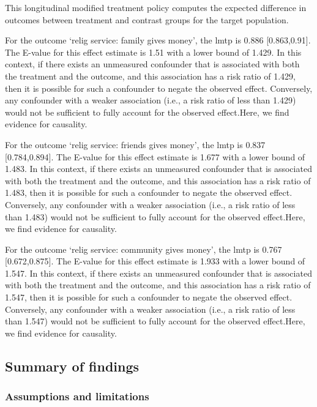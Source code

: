 \documentclass[
  singlecolumn]{article}
\begin{document}
This longitudinal modified treatment policy computes the expected
difference in outcomes between treatment and contrast groups for the
target population.

For the outcome `relig service: family gives money', the lmtp is 0.886
{[}0.863,0.91{]}. The E-value for this effect estimate is 1.51 with a
lower bound of 1.429. In this context, if there exists an unmeasured
confounder that is associated with both the treatment and the outcome,
and this association has a risk ratio of 1.429, then it is possible for
such a confounder to negate the observed effect. Conversely, any
confounder with a weaker association (i.e., a risk ratio of less than
1.429) would not be sufficient to fully account for the observed
effect.Here, we find evidence for causality.

For the outcome `relig service: friends gives money', the lmtp is 0.837
{[}0.784,0.894{]}. The E-value for this effect estimate is 1.677 with a
lower bound of 1.483. In this context, if there exists an unmeasured
confounder that is associated with both the treatment and the outcome,
and this association has a risk ratio of 1.483, then it is possible for
such a confounder to negate the observed effect. Conversely, any
confounder with a weaker association (i.e., a risk ratio of less than
1.483) would not be sufficient to fully account for the observed
effect.Here, we find evidence for causality.

For the outcome `relig service: community gives money', the lmtp is
0.767 {[}0.672,0.875{]}. The E-value for this effect estimate is 1.933
with a lower bound of 1.547. In this context, if there exists an
unmeasured confounder that is associated with both the treatment and the
outcome, and this association has a risk ratio of 1.547, then it is
possible for such a confounder to negate the observed effect.
Conversely, any confounder with a weaker association (i.e., a risk ratio
of less than 1.547) would not be sufficient to fully account for the
observed effect.Here, we find evidence for causality.

\subsection{Summary of findings}\label{summary-of-findings}

\subsubsection{Assumptions and
limitations}\label{assumptions-and-limitations}
\end{document}
